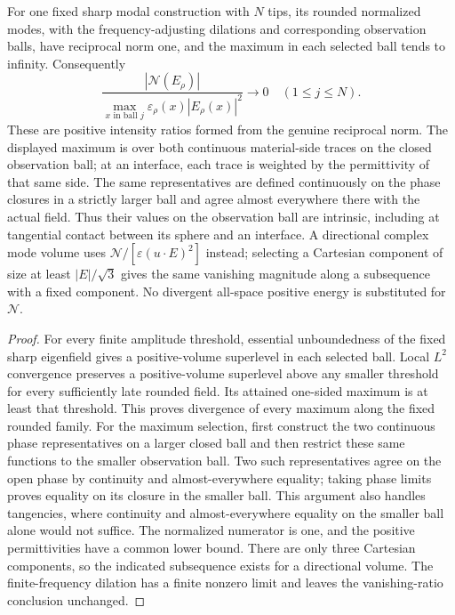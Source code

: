 \begin{corollary}
\label{ms:modal-volume}
For one fixed sharp modal construction with $N$ tips, its rounded
normalized modes, with the frequency-adjusting dilations and corresponding
observation balls, have reciprocal norm one, and the maximum in each
selected ball tends to infinity. Consequently
\begin{equation}
 \frac{|\mathcal N(E_\rho)|}
 {\displaystyle\max_{x\text{ in ball }j}
        \varepsilon_\rho(x)|E_\rho(x)|^2}\longrightarrow0
 \quad (1\leq j\leq N).
\end{equation}
These are positive intensity ratios formed from the genuine
reciprocal norm.  The displayed maximum is over both continuous
material-side traces on the closed observation ball; at an interface,
each trace is weighted by the permittivity of that same side.
The same representatives are defined continuously on the phase closures
in a strictly larger ball and agree almost everywhere there with the
actual field. Thus their values on the observation ball are intrinsic,
including at tangential contact between its sphere and an interface.
A directional complex mode volume uses
$\mathcal N/[\varepsilon(u\cdot E)^2]$ instead; selecting a
Cartesian component of size at least $|E|/\sqrt3$ gives the same
vanishing magnitude along a subsequence with a fixed component.
No divergent all-space positive energy is substituted for
$\mathcal N$.
\end{corollary}

\begin{proof}
For every finite amplitude threshold, essential unboundedness of
the fixed sharp eigenfield gives a positive-volume superlevel in
each selected ball.  Local $L^2$ convergence preserves a
positive-volume superlevel above any smaller threshold for every
sufficiently late rounded field.  Its attained one-sided maximum
is at least that threshold.  This proves divergence of every
maximum along the fixed rounded family.
For the maximum selection, first construct the two continuous phase
representatives on a larger closed ball and then restrict these same
functions to the smaller observation ball. Two such representatives
agree on the open phase by continuity and almost-everywhere equality;
taking phase limits proves equality on its closure in the smaller ball.
This argument also handles tangencies, where continuity and
almost-everywhere equality on the smaller ball alone would not suffice.
The normalized numerator is one, and the positive permittivities
have a common lower bound.  There are only three Cartesian
components, so the indicated subsequence exists for a directional
volume.  The finite-frequency dilation has a finite nonzero limit
and leaves the vanishing-ratio conclusion unchanged.
\end{proof}
